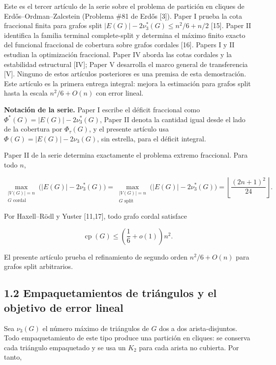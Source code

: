 \documentclass[spanish,11pt,a4paper]{article}
\begin{document}
Este es el tercer artículo de la serie sobre el problema de partición en
cliques de Erdős--Ordman--Zalcstein (Problema \#81 de Erdős {[}3{]}).
Paper I prueba la cota fraccional finita para grafos split
\(|E(G)|-2\nu_3^*(G)\le n^2/6+n/2\) {[}15{]}. Paper II identifica la
familia terminal complete-split y determina el máximo finito exacto del
funcional fraccional de cobertura sobre grafos cordales {[}16{]}. Papers
I y II estudian la optimización fraccional. Paper IV aborda las cotas
cordales y la estabilidad estructural {[}IV{]}; Paper V desarrolla el
marco general de transferencia {[}V{]}. Ninguno de estos artículos
posteriores es una premisa de esta demostración. Este artículo es la
primera entrega integral: mejora la estimación para grafos split hasta
la escala \(n^2/6+O(n)\) con error lineal.

\textbf{Notación de la serie.} Paper I escribe el déficit fraccional
como \(\Phi^*(G)=|E(G)|-2\nu_3^*(G)\), Paper II denota la cantidad igual
desde el lado de la cobertura por \(\Phi_\tau(G)\), y el presente
artículo usa \(\Phi(G)=|E(G)|-2\nu_3(G)\), sin estrella, para el déficit
integral.

Paper II de la serie determina exactamente el problema extremo
fraccional. Para todo \(n\),

\[
\max_{\substack{|V(G)|=n\\G\text{ cordal}}}
\bigl(|E(G)|-2\nu_3^*(G)\bigr)
=
\max_{\substack{|V(G)|=n\\G\text{ split}}}
\bigl(|E(G)|-2\nu_3^*(G)\bigr)
=
\left\lfloor\frac{(2n+1)^2}{24}\right\rfloor.
\]

Por Haxell--Rödl y Yuster {[}11,17{]}, todo grafo cordal satisface

\[
\operatorname{cp}(G)
\le
\left(\frac16+o(1)\right)n^2.
\]

El presente artículo prueba el refinamiento de segundo orden
\(n^2/6+O(n)\) para grafos split arbitrarios.

\subsection{1.2 Empaquetamientos de triángulos y el objetivo de error
lineal}\label{empaquetamientos-de-triuxe1ngulos-y-el-objetivo-de-error-lineal}

Sea \(\nu_3(G)\) el número máximo de triángulos de \(G\) dos a dos
arista-disjuntos. Todo empaquetamiento de este tipo produce una
partición en cliques: se conserva cada triángulo empaquetado y se usa un
\(K_2\) para cada arista no cubierta. Por tanto,
\end{document}
